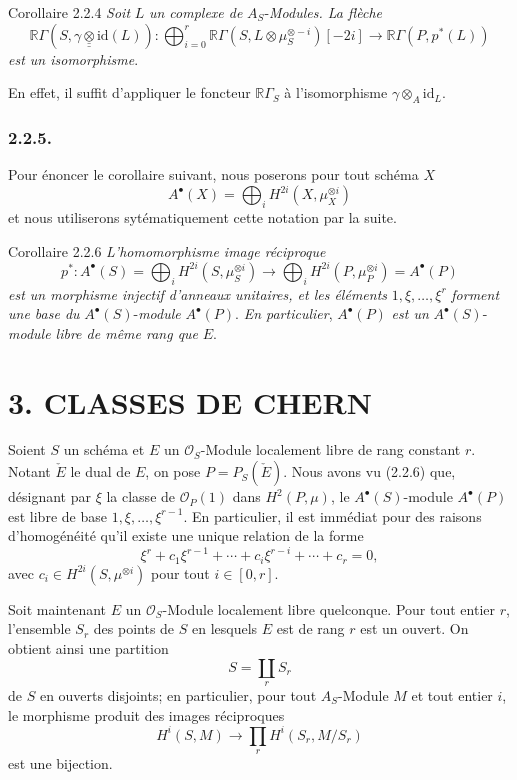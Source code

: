 \begin{statement}{Corollaire 2.2.4}
\emph{Soit} $L$ \emph{un complexe de} $A_S$-\emph{Modules. La flèche}
\[
\mathbb{R}\Gamma(S,\gamma\mathbin{\underline{\underline{\otimes}}}\mathrm{id}(L)):
\bigoplus_{i=0}^r \mathbb{R}\Gamma(S,L\otimes\mu_S^{\otimes -i})[-2i]
\longrightarrow
\mathbb{R}\Gamma(P,p^*(L))
\]
\emph{est un isomorphisme}.
\end{statement}

En effet, il suffit d'appliquer le foncteur $\mathbb{R}\Gamma_S$ à l'isomorphisme $\gamma\otimes_A\mathrm{id}_L$.

\subsubsection*{2.2.5.}
Pour énoncer le corollaire suivant, nous poserons pour tout schéma $X$
\[
A^\bullet(X)=\bigoplus_i H^{2i}(X,\mu_X^{\otimes i})
\]
et nous utiliserons sytématiquement cette notation par la suite.

\begin{statement}{Corollaire 2.2.6}
\emph{L'homomorphisme image réciproque}
\[
p^*:A^\bullet(S)=\bigoplus_i H^{2i}(S,\mu_S^{\otimes i})
\longrightarrow
\bigoplus_i H^{2i}(P,\mu_P^{\otimes i})=A^\bullet(P)
\]
\emph{est un morphisme injectif d'anneaux unitaires, et les éléments} $1,\xi,\ldots,\xi^r$ \emph{forment une base du} $A^\bullet(S)$-\emph{module} $A^\bullet(P)$. \emph{En particulier}, $A^\bullet(P)$ \emph{est un} $A^\bullet(S)$-\emph{module libre de même rang que} $E$.
\end{statement}

\section*{3. CLASSES DE CHERN}

Soient $S$ un schéma et $E$ un $\mathcal{O}_S$-Module localement libre de rang constant $r$. Notant $\check E$ le dual de $E$, on pose $P=P_S(\check E)$. Nous avons vu (2.2.6) que, désignant par $\xi$ la classe de $\mathcal{O}_P(1)$ dans $H^2(P,\mu)$, le $A^\bullet(S)$-module $A^\bullet(P)$ est libre de base $1,\xi,\ldots,\xi^{r-1}$. En particulier, il est immédiat pour des raisons d'homogénéité qu'il existe une unique relation de la forme
\[
\xi^r+c_1\xi^{r-1}+\cdots+c_i\xi^{r-i}+\cdots+c_r=0,
\tag*{3.1.}
\]
avec $c_i\in H^{2i}(S,\mu^{\otimes i})$ pour tout $i\in[0,r]$.

Soit maintenant $E$ un $\mathcal{O}_S$-Module localement libre quelconque. Pour tout entier $r$, l'ensemble $S_r$ des points de $S$ en lesquels $E$ est de rang $r$ est un ouvert. On obtient ainsi une partition
\[
S=\coprod_r S_r
\]
de $S$ en ouverts disjoints; en particulier, pour tout $A_S$-Module $M$ et tout entier $i$, le morphisme produit des images réciproques
\[
H^i(S,M)\longrightarrow \prod_r H^i(S_r,M/S_r)
\]
est une bijection.

